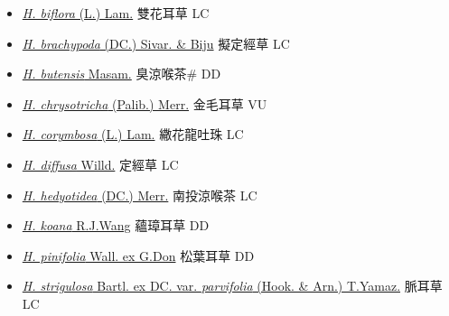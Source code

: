 \begin{itemize}
  \begin{itemize}
        \item[] \href{http://www.theplantlist.org/tpl1.1/search?q=Hedyotis+biflora}{\textit{H. biflora} (L.) Lam.}   雙花耳草 LC
        \item[] \href{http://www.theplantlist.org/tpl1.1/search?q=Hedyotis+brachypoda}{\textit{H. brachypoda} (DC.) Sivar. \& Biju}   擬定經草 LC
        \item[] \href{http://www.theplantlist.org/tpl1.1/search?q=Hedyotis+butensis}{\textit{H. butensis} Masam.}   臭涼喉茶\# DD
        \item[] \href{http://www.theplantlist.org/tpl1.1/search?q=Hedyotis+chrysotricha}{\textit{H. chrysotricha} (Palib.) Merr.}   金毛耳草 VU
        \item[] \href{http://www.theplantlist.org/tpl1.1/search?q=Hedyotis+corymbosa}{\textit{H. corymbosa} (L.) Lam.}   繖花龍吐珠 LC
        \item[] \href{http://www.theplantlist.org/tpl1.1/search?q=Hedyotis+diffusa}{\textit{H. diffusa} Willd.}   定經草 LC
        \item[] \href{http://www.theplantlist.org/tpl1.1/search?q=Hedyotis+hedyotidea}{\textit{H. hedyotidea} (DC.) Merr.}   南投涼喉茶 LC
        \item[] \href{http://www.theplantlist.org/tpl1.1/search?q=Hedyotis+koana}{\textit{H. koana} R.J.Wang}   蘊璋耳草 DD
        \item[] \href{http://www.theplantlist.org/tpl1.1/search?q=Hedyotis+pinifolia}{\textit{H. pinifolia} Wall. ex G.Don}   松葉耳草 DD
        \item[] \href{http://www.theplantlist.org/tpl1.1/search?q=Hedyotis+strigulosa+var.+parvifolia}{\textit{H. strigulosa} Bartl. ex DC. var. \textit{parvifolia} (Hook. \& Arn.) T.Yamaz.}   脈耳草 LC

\end{itemize}
\end{itemize}
